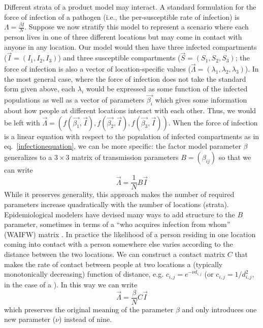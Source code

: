 Different strata of a product model may interact.
A standard formulation for the force of infection of a pathogen (i.e., the per-susceptible rate of infection) is
$\Lambda = \frac{\beta I}{N}$. Suppose we now stratify this model to represent a scenario where each person lives in one of three different locations but may come in contact with anyone in any  location. Our model would then have three infected compartments ($\vec{I} = (I_1, I_2, I_3)$) and three susceptible compartments ($\vec{S} = (S_1, S_2, S_3)$; the force of infection is also a vector of location-specific values ($\vec{\Lambda} = (\lambda_1, \lambda_2, \lambda_3)$). 
In the most general case, where the force of infection does not take the standard form given above, each $\lambda_i$ would be expressed as some function of the infected populations as well as a vector of parameters $\vec{\beta_i}$ which gives some information about how people at different locations interact with each other. Thus, we would be left with $\vec{\Lambda} = (f(\vec{\beta_1}, \vec{I}), f(\vec{\beta_2}, \vec{I}), f(\vec{\beta_3}, \vec{I}))$. 
When the force of infection is a linear equation with respect to the population of infected compartments as in eq.~\ref{infectionequation}, we can be more specific: the factor model parameter $\beta$ generalizes to a $3 \times 3$ matrix of transmission parameters $B = \left(\beta_{ij}\right)$
so that we can write
\[
    \vec{\Lambda} = \frac{1}{N} B \vec{I}
\]
While it preserves generality, this approach makes the number of required parameters increase quadratically with the number of locations (strata). Epidemiological modelers have devised many ways to add structure to the $B$ parameter, sometimes in terms of a ``who acquires infection from whom'' (WAIFW) matrix \cite{andemay85, andemaybook, grenande85}. In practice the likelihood of a person residing in one location coming into contact with a person somewhere else varies according to the distance between the two locations. We can construct a contact matrix $C$ that makes the rate of contact between people at two locations a (typically monotonically decreasing) function of distance, e.g. $c_{i,j} = e^{-\nu d_{i,j}}$ (or $c_{i,j} = 1/d_{i,j}^2$, in the case of a  \citep{xiaMeasles2004}).
In this way we can write
\[
    \vec{\Lambda} = \frac{\beta}{N} C \vec{I}
\]
which preserves the original meaning of the parameter $\beta$ and only introduces one new parameter ($\nu$) instead of nine.

